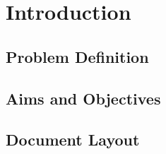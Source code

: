 \chapter{Introduction}
\section{Problem Definition}
\section{Aims and Objectives}
\section{Document Layout}
